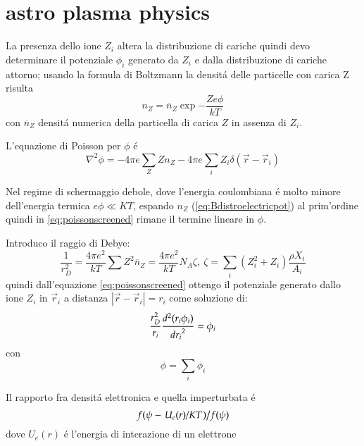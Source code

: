 \chapter{astro plasma physics}

La presenza dello ione $Z_i$ altera la distribuzione di cariche quindi devo determinare il potenziale $\phi_i$ generato da $Z_i$ e dalla distribuzione di cariche attorno; usando la formula di Boltzmann la densit\'a delle particelle con carica Z risulta
\begin{equation}\label{eq:Bdistroelectricpot}
n_Z=\overline{n}_Z\exp{-\frac{Ze\phi}{kT}}
\end{equation}
con $\overline{n}_Z$ densit\'a numerica della particella di carica $Z$ in assenza di $Z_i$.

L'equazione di Poisson per $\phi$ \'e
\begin{equation}\label{eq:poissonscreened}
\nabla^2\phi=-4\pi e\sum_Z Zn_Z-4\pi e\sum_i Z_i\delta(\vec{r}-\vec{r}_i)
\end{equation}

Nel regime di schermaggio debole, dove l'energia coulombiana \'e molto minore dell'energia termica $e\phi\ll KT$, espando $n_Z$ (\eqref{eq:Bdistroelectricpot}) al prim'ordine quindi in \eqref{eq:poissonscreened} rimane il termine lineare in $\phi$.

Introduco il raggio di Debye:
\begin{equation}
\frac{1}{r_D^2}=\frac{4\pi e^2}{kT}\sum Z^2\overline{n}_Z=\frac{4\pi e^2}{kT}N_A\zeta,\ \zeta=\sum_{i}(Z_i^2+Z_i)\frac{\rho X_i}{A_i}\label{eq:debyeradius}
\end{equation}
quindi dall'equazione \eqref{eq:poissonscreened} ottengo il potenziale generato dallo ione $Z_i$ in $\vec{r}_i$ a distanza $|\vec{r}-\vec{r}_i|=r_i$ come soluzione di:
\begin{equation}\label{eq:poissonspheric}
\frac{r_D^2}{r_i}\TtwoDy{r_i}{(r_i\phi_i)}=\phi_i
\end{equation}
con
\begin{equation}
\phi=\sum_i\phi_i
\end{equation}

\begin{workout}
Il rapporto fra densit\'a elettronica e quella imperturbata \'e
\begin{equation}
\midfrac{f(\psi-\midfrac{U_e(r)}{KT})}{f(\psi)}
\end{equation}
dove $U_e(r)$ \'e l'energia di interazione di un elettrone
\end{workout}

